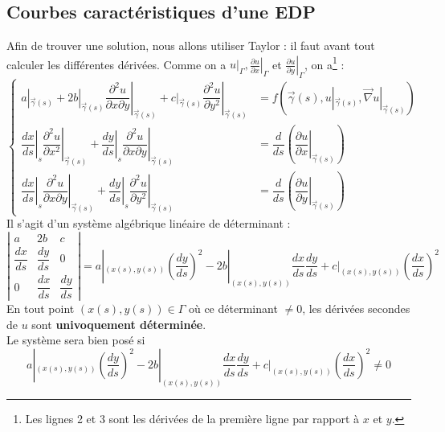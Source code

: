 \documentclass	[11pt, a4paper, openany]{book}
\begin{document}
\subsection{Courbes caractéristiques d'une EDP}
Afin de trouver une solution, nous allons utiliser Taylor : il faut avant tout calculer les différentes dérivées. Comme on a $u|_\Gamma, \left.\frac{\partial u}{\partial x}\right|_\Gamma$ et $\left.\frac{\partial u}{\partial y}\right|_\Gamma$, on a\footnote{Les lignes 2 et 3 sont les dérivées de la première ligne par rapport à $x$ et $y$.} :
\begin{equation}
\left\{\begin{array}{ll}
a|_{\vec{\gamma}(s)} + 2b|_{\vec{\gamma}(s)}\left.\dfrac{\partial^2 u}{\partial x \partial y}\right|_{\vec{\gamma}(s)} + c|_{\vec{\gamma}(s)}\left.\dfrac{\partial^2u}{\partial y^2}\right|_{\vec{\gamma}(s)} &= f(\vec{\gamma}(s), u|_{\vec{\gamma}(s)}, \vec \nabla u|_{\vec{\gamma}(s)})\\
\left.\dfrac{dx}{ds}\right|_{s}\left.\dfrac{\partial^2u}{\partial x^2}\right|_{\vec{\gamma}(s)} + \left.\dfrac{dy}{ds}\right|_{s}\left.\dfrac{\partial^2u}{\partial x\partial y}\right|_{\vec{\gamma}(s)} &= \dfrac{d}{ds}\left(\left.\dfrac{\partial u}{\partial x}\right|_{\vec{\gamma}(s)}\right)\\
\left.\dfrac{dx}{ds}\right|_{s}\left.\dfrac{\partial^2u}{\partial x\partial y}\right|_{\vec{\gamma}(s)} + \left.\dfrac{dy}{ds}\right|_{s}\left.\dfrac{\partial^2u}{\partial y^2}\right|_{\vec{\gamma}(s)} &= \dfrac{d}{ds}\left(\left.\dfrac{\partial u}{\partial y}\right|_{\vec{\gamma}(s)}\right)
\end{array}\right.
\end{equation}
Il s'agit d'un système algébrique linéaire de déterminant  :
\begin{equation}
\left|\begin{array}{ccc}
a & 2b & c\\
\dfrac{dx}{ds} & \dfrac{dy}{ds} & 0\\
0 & \dfrac{dx}{ds} & \dfrac{dy}{ds}
\end{array}\right| = a|_{(x(s),y(s))} \left(\dfrac{dy}{ds}\right)^2 - 2b|_{(x(s),y(s))} \dfrac{dx}{ds}\dfrac{dy}{ds} + c|_{(x(s),y(s))}\left(\dfrac{dx}{ds}\right)^2
\end{equation}
En tout point $(x(s),y(s)) \in \Gamma$ où ce déterminant $\neq 0$, les dérivées secondes de $u$ sont \textbf{univoquement déterminée}.\\
Le système sera bien posé si
\begin{equation}
 a|_{(x(s),y(s))} \left(\dfrac{dy}{ds}\right)^2 - 2b|_{(x(s),y(s))} \dfrac{dx}{ds}\dfrac{dy}{ds} + c|_{(x(s),y(s))}\left(\dfrac{dx}{ds}\right)^2 \neq 0
\end{equation}
\end{document}
